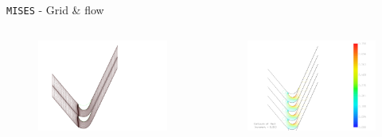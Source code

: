 \begin{frame}{\texttt{MISES} - Grid \& flow}
    \vspace{-2.5cm}
    \begin{columns}
        \vspace{0.5cm}
        \begin{figure}
            \centering
            \includegraphics[scale=0.4]{./images/datablade120-3.png}
        \end{figure}
        \begin{figure}
            \centering
            \includegraphics[scale=0.4]{./images/datablade120-4.png}
        \end{figure}
    \end{columns}
\end{frame}

